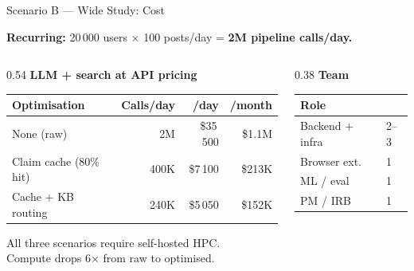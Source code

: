 \documentclass[11pt, aspectratio=169]{beamer}
\begin{document}
\begin{frame}{Scenario B — Wide Study: Cost}

  \textbf{Recurring:} 20\,000 users $\times$ 100 posts/day = \textbf{2M pipeline calls/day.}

  \bigskip
  \begin{columns}[T]
    \begin{column}{0.54\textwidth}
      \textbf{LLM + search at API pricing}\\[6pt]
      \renewcommand{\arraystretch}{1.3}
      \begin{tabular}{lrrr}
        \toprule
        Optimisation & Calls/day & /day & /month \\
        \midrule
        None (raw)             & 2M   & \alert{\$35\,500} & \alert{\$1.1M} \\
        Claim cache (80\% hit) & 400K & \$7\,100          & \$213K \\
        Cache + KB routing     & 240K & \$5\,050          & \$152K \\
        \bottomrule
      \end{tabular}

      \bigskip
      All three scenarios require self-hosted HPC.\\
      Compute drops \alert{6$\times$} from raw to optimised.
    \end{column}
    \begin{column}{0.38\textwidth}
      \textbf{Team}\\[6pt]
      \renewcommand{\arraystretch}{1.3}
      \begin{tabular}{ll}
        \toprule
        Role & \\
        \midrule
        Backend + infra  & 2--3 \\
        Browser ext.     & 1    \\
        ML / eval        & 1    \\
        PM / IRB         & 1    \\
        \bottomrule
      \end{tabular}
    \end{column}
  \end{columns}
\end{frame}
\end{document}
